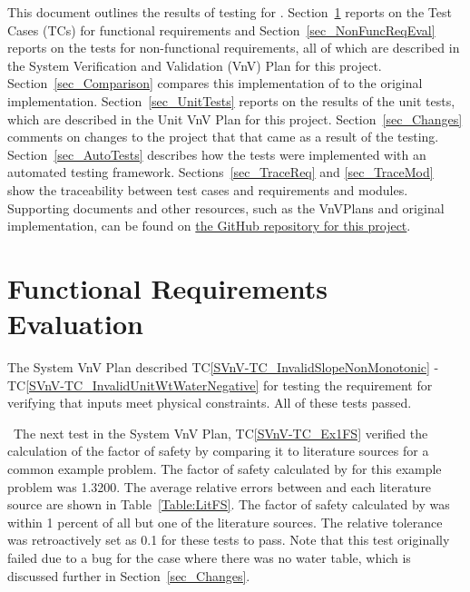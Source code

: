 \documentclass[12pt, titlepage]{article}
\newcommand{\tcref}[1]{TC\ref{#1}}
\begin{document}
\listoffigures %

\newpage


This document outlines the results of testing for \progname{}. 
Section~\ref{sec_FuncReqEval} reports on the Test Cases (TCs) for functional 
requirements and Section~\ref{sec_NonFuncReqEval} reports on the tests for 
non-functional requirements, all of which are described in the System 
Verification and Validation (VnV) Plan for this project. 
Section~\ref{sec_Comparison} compares this implementation of \progname{} to the 
original implementation. Section~\ref{sec_UnitTests} reports on the results of 
the unit tests, which are described in the Unit VnV Plan for this project. 
Section~\ref{sec_Changes} comments on changes to the project that that came as 
a result of the testing. Section~\ref{sec_AutoTests} describes how the tests 
were implemented with an automated testing framework. 
Sections~\ref{sec_TraceReq} and \ref{sec_TraceMod} show the traceability 
between test cases and requirements and modules. Supporting documents and other 
resources, such as the VnVPlans and original implementation, can be found on 
\href{https://github.com/smiths/caseStudies/tree/master/CaseStudies/ssp}{the 
GitHub repository for this project}.

\section{Functional Requirements Evaluation} \label{sec_FuncReqEval}

The System VnV Plan described \tcref{SVnV-TC_InvalidSlopeNonMonotonic} - 
\tcref{SVnV-TC_InvalidUnitWtWaterNegative} for testing the requirement for 
verifying that inputs meet physical constraints. All of these tests passed. 

~\newline \noindent The next test in the System VnV Plan, \tcref{SVnV-TC_Ex1FS} 
verified 
the calculation of the factor of safety by comparing it to literature sources 
for a common example problem. The factor of safety calculated by \progname{} 
for 
this example problem was 1.3200. The average relative errors between 
\progname{} 
and each literature source are shown in Table~\ref{Table:LitFS}. The factor of 
safety calculated by \progname{} was within 1 percent of all but one of the 
literature sources. The relative tolerance was retroactively set as 0.1 for 
these tests to pass. Note that this test originally failed due to a bug for the 
case where there was no water table, which is discussed further in 
Section~\ref{sec_Changes}.
\end{document}

